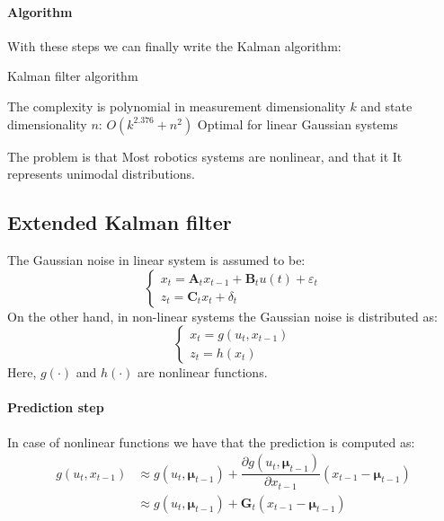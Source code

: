 \paragraph*{Algorithm} 
With these steps we can finally write the Kalman algorithm: 
\begin{algorithm}[H]
    \caption{Kalman filter algorithm}
        \begin{algorithmic}[1]
             
              
            \State{}
        \end{algorithmic}
\end{algorithm}
The complexity is polynomial in measurement dimensionality $k$ and state dimensionality $n$: $O(k^{2.376} + n^2)$
Optimal for linear Gaussian systems

The problem is that Most robotics systems are nonlinear, and that it It represents unimodal distributions. 

\subsection{Extended Kalman filter}
The Gaussian noise in linear system is assumed to be: 
\[\begin{cases}
    x_t=\mathbf{A}_tx_{t-1}+\mathbf{B}_tu(t)+\varepsilon_t \\
    z_t=\mathbf{C}_tx_t+\delta_t
\end{cases}\]
On the other hand, in non-linear systems the Gaussian noise is distributed as: 
\[\begin{cases}
    x_t=g(u_t,x_{t-1}) \\
    z_t=h(x_t)
\end{cases}\]
Here, $g(\cdot)$ and $h(\cdot)$ are nonlinear functions. 

\paragraph*{Prediction step}
In case of nonlinear functions we have that the prediction is computed as: 
\begin{align*}
    g(u_t,x_{t-1})  &\approx g(u_t,\boldsymbol{\mu}_{t-1})+\dfrac{\partial g(u_t,\boldsymbol{\mu}_{t-1})}{\partial x_{t-1}} (x_{t-1}-\boldsymbol{\mu}_{t-1}) \\
                    &\approx g(u_t,\boldsymbol{\mu}_{t-1})+\mathbf{G}_t(x_{t-1}-\boldsymbol{\mu}_{t-1})
\end{align*} 

